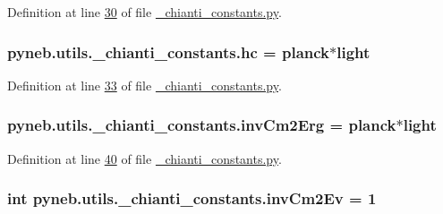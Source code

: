 Definition at line \hyperlink{__chianti__constants_8py_source_l00030}{30} of file \hyperlink{__chianti__constants_8py_source}{\-\_\-chianti\-\_\-constants.\-py}.

\hypertarget{namespacepyneb_1_1utils_1_1__chianti__constants_a8289cc3d42b316da94c2a0b29751cfb1}{
\subsubsection[{hc}]{\setlength{\rightskip}{0pt plus 5cm}pyneb.\-utils.\-\_\-chianti\-\_\-constants.\-hc = {\bf planck}$\ast${\bf light}}}\label{namespacepyneb_1_1utils_1_1__chianti__constants_a8289cc3d42b316da94c2a0b29751cfb1}


Definition at line \hyperlink{__chianti__constants_8py_source_l00033}{33} of file \hyperlink{__chianti__constants_8py_source}{\-\_\-chianti\-\_\-constants.\-py}.

\hypertarget{namespacepyneb_1_1utils_1_1__chianti__constants_a6e27225d6b76f3f489d31098bb0206e4}{
\subsubsection[{inv\-Cm2\-Erg}]{\setlength{\rightskip}{0pt plus 5cm}pyneb.\-utils.\-\_\-chianti\-\_\-constants.\-inv\-Cm2\-Erg = {\bf planck}$\ast${\bf light}}}\label{namespacepyneb_1_1utils_1_1__chianti__constants_a6e27225d6b76f3f489d31098bb0206e4}


Definition at line \hyperlink{__chianti__constants_8py_source_l00040}{40} of file \hyperlink{__chianti__constants_8py_source}{\-\_\-chianti\-\_\-constants.\-py}.

\hypertarget{namespacepyneb_1_1utils_1_1__chianti__constants_ae0200a00fec725b466ac250dbd8e85f3}{
\subsubsection[{inv\-Cm2\-Ev}]{\setlength{\rightskip}{0pt plus 5cm}int pyneb.\-utils.\-\_\-chianti\-\_\-constants.\-inv\-Cm2\-Ev = 1}}\label{namespacepyneb_1_1utils_1_1__chianti__constants_ae0200a00fec725b466ac250dbd8e85f3}


